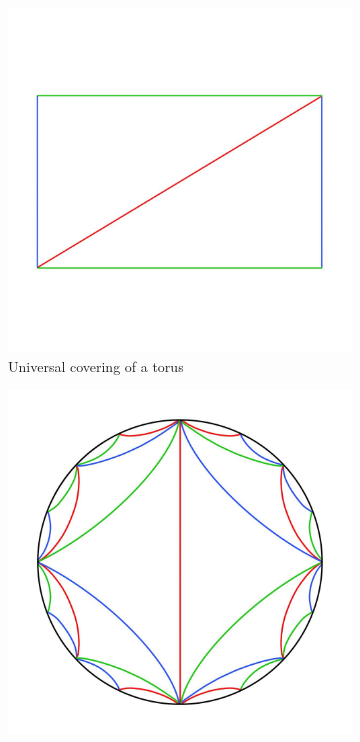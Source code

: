 \documentclass[12pt,a4paper,reqno,parskip=full]{amsart}
\numberwithin{equation}{section}
\theoremstyle{plain}
\theoremstyle{definition}
\begin{document}
\begin{figure}
     \centering
     \captionsetup{justification=centering}
     
     \begin{subfigure}[b]{0.4\textwidth}
         \centering
         \includegraphics[width=\textwidth]{images/Universal Covering.jpg}
         \caption{Universal covering of a torus}
     \end{subfigure}
     \hfill
     \begin{subfigure}[b]{0.4\textwidth}
         \centering
         \includegraphics[width=\textwidth]{images/RS colored detailed.jpg}

\end{subfigure}
\end{figure}
\end{document}
